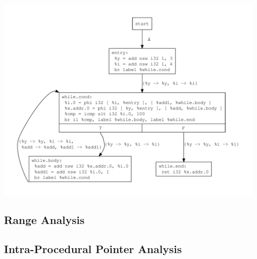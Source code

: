 \documentclass{article}
\theoremstyle{definition}
\begin{document}
\includegraphics[scale=.4]{figures/cse/loop/loop-no-do-cse.pdf}
\subsection{Range Analysis}
\subsection{Intra-Procedural Pointer Analysis}
\end{document}
